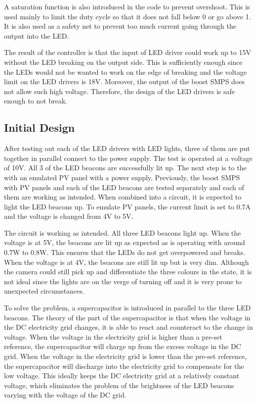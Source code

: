 A saturation function is also introduced in the code to prevent overshoot. This is used mainly to limit the duty cycle so that it does not fall below 0 or go above 1. It is also used as a safety net to prevent too much current going through the output into the LED.

The result of the controller is that the input of LED driver could work up to 15V without the LED breaking on the output side. This is sufficiently enough since the LEDs would not be wanted to work on the edge of breaking and the voltage limit on the LED drivers is 18V. Moreover, the output of the boost SMPS does not allow such high voltage. Therefore, the design of the LED drivers is safe enough to not break.

\subsection{Initial Design}

\begin{figure}
\end{figure}

After testing out each of the LED drivers with LED lights, three of them are put together in parallel connect to the power supply. The test is operated at a voltage of 10V. All 3 of the LED beacons are successfully lit up. The next step is to the with an emulated PV panel with a power supply. Previously, the boost SMPS with PV panels and each of the LED beacons are tested separately and each of them are working as intended. When combined into a circuit, it is expected to light the LED beacons up. To emulate PV panels, the current limit is set to 0.7A and the voltage is changed from 4V to 5V.

The circuit is working as intended. All three LED beacons light up. When the voltage is at 5V, the beacons are lit up as expected as is operating with around 0.7W to 0.8W. This ensures that the LEDs do not get overpowered and breaks. When the voltage is at 4V, the beacons are still lit up but is very dim. Although the camera could still pick up and differentiate the three colours in the state, it is not ideal since the lights are on the verge of turning off and it is very prone to unexpected circumstances.

To solve the problem, a supercapacitor is introduced in parallel to the three LED beacons. The theory of the part of the supercapacitor is that when the voltage in the DC electricity grid changes, it is able to react and counteract to the change in voltage. When the voltage in the electricity grid is higher than a pre-set reference, the supercapacitor will charge up from the excess voltage in the DC grid. When the voltage in the electricity grid is lower than the pre-set reference, the supercapacitor will discharge into the electricity grid to compensate for the low voltage. This ideally keeps the DC electricity grid at a relatively constant voltage, which eliminates the problem of the brightness of the LED beacons varying with the voltage of the DC grid.

